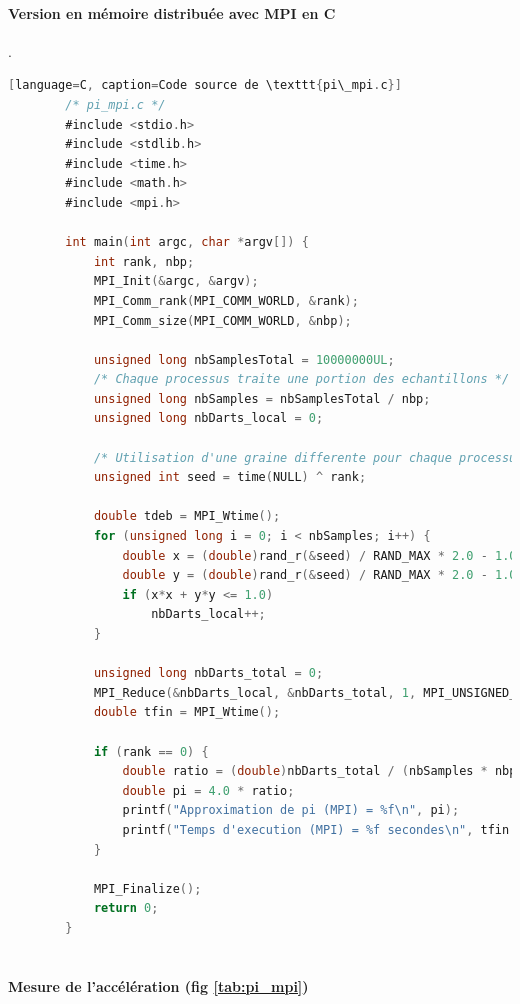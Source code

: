 \documentclass[a4paper,13pt]{book}
\begin{document}
    \paragraph{Version en mémoire distribuée avec MPI en C}.\\
    \begin{lstlisting}[language=C][language=C, caption=Code source de \texttt{pi\_mpi.c}]
        /* pi_mpi.c */
        #include <stdio.h>
        #include <stdlib.h>
        #include <time.h>
        #include <math.h>
        #include <mpi.h>
        
        int main(int argc, char *argv[]) {
            int rank, nbp;
            MPI_Init(&argc, &argv);
            MPI_Comm_rank(MPI_COMM_WORLD, &rank);
            MPI_Comm_size(MPI_COMM_WORLD, &nbp);
        
            unsigned long nbSamplesTotal = 10000000UL;
            /* Chaque processus traite une portion des echantillons */
            unsigned long nbSamples = nbSamplesTotal / nbp;
            unsigned long nbDarts_local = 0;
        
            /* Utilisation d'une graine differente pour chaque processus */
            unsigned int seed = time(NULL) ^ rank;
        
            double tdeb = MPI_Wtime();
            for (unsigned long i = 0; i < nbSamples; i++) {
                double x = (double)rand_r(&seed) / RAND_MAX * 2.0 - 1.0;
                double y = (double)rand_r(&seed) / RAND_MAX * 2.0 - 1.0;
                if (x*x + y*y <= 1.0)
                    nbDarts_local++;
            }
        
            unsigned long nbDarts_total = 0;
            MPI_Reduce(&nbDarts_local, &nbDarts_total, 1, MPI_UNSIGNED_LONG, MPI_SUM, 0, MPI_COMM_WORLD);
            double tfin = MPI_Wtime();
        
            if (rank == 0) {
                double ratio = (double)nbDarts_total / (nbSamples * nbp);
                double pi = 4.0 * ratio;
                printf("Approximation de pi (MPI) = %f\n", pi);
                printf("Temps d'execution (MPI) = %f secondes\n", tfin - tdeb);
            }
        
            MPI_Finalize();
            return 0;
        }        
        
\end{lstlisting}

\paragraph{Mesure de l'accélération (fig \ref{tab:pi_mpi})}
\end{document}
